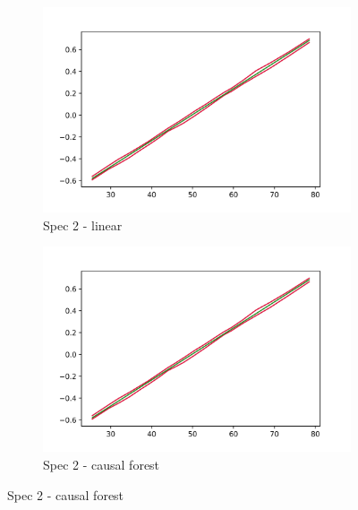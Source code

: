 \begin{figure}[h]
    \begin{subfigure}{0.5\linewidth}
        \includegraphics[width=\linewidth]{figures/ALE/chTOTexp/spec2_linear_AGE.png}
        \caption{Spec 2 - linear}
    \end{subfigure}%
    \begin{subfigure}{0.5\linewidth}
        \includegraphics[width=\linewidth]{figures/ALE/chTOTexp/spec2_linear_AGE.png}
        \caption{Spec 2 - causal forest}
    \end{subfigure}


\end{figure}
